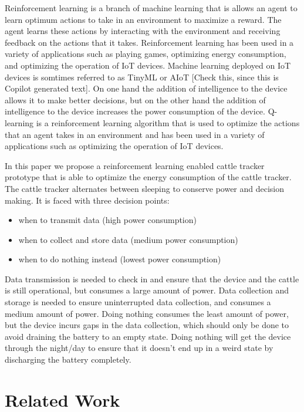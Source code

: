 \documentclass[10pt]{cai}
\begin{document}
Reinforcement learning is a branch of machine learning that is allows an agent to learn optimum actions to take in an environment to maximize a reward.
The agent learns these actions by interacting with the environment and receiving feedback on the actions that it takes.
Reinforcement learning has been used in a variety of applications such as playing games, optimizing energy consumption, and optimizing the operation of IoT devices.
Machine learning deployed on IoT devices is somtimes referred to as TinyML or AIoT [Check this, since this is Copilot generated text].
On one hand the addition of intelligence to the device allows it to make better decisions, but on the other hand the addition of intelligence to the device increases the power consumption of the device.
Q-learning is a reinforcement learning algorithm that is used to optimize the actions that an agent takes in an environment and has been used in a variety of applications such as optimizing the operation of IoT devices.

In this paper we propose a reinforcement learning enabled cattle tracker prototype that is able to optimize the energy consumption of the cattle tracker.
The cattle tracker alternates between sleeping to conserve power and decision making. 
It is faced with three decision points: 

\begin{itemize}
  \item when to transmit data (high power consumption)
  \item when to collect and store data (medium power consumption)
  \item when to do nothing instead (lowest power consumption)
\end{itemize}

Data transmission is needed to check in and ensure that the device and the cattle is still operational, but consumes a large amount of power.
Data collection and storage is needed to ensure uninterrupted data collection, and consumes a medium amount of power.
Doing nothing consumes the least amount of power, but the device incurs gaps in the data collection, which should only be done to avoid draining the battery to an empty state.
Doing nothing will get the device through the night/day to ensure that it doesn't end up in a weird state by discharging the battery completely.

\section{Related Work}
\end{document}
